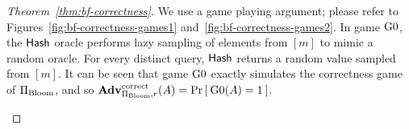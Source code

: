 \begin{proof}[Theorem~\ref{thm:bf-correctness}]
We use a game playing argument; please refer to
Figures~\ref{fig:bf-correctness-games1}
and~\ref{fig:bf-correctness-games2}. In game $\text{G0}$, the
$\mathsf{Hash}$ oracle performs lazy sampling of elements from $[m]$
to mimic a random oracle. For every distinct query, $\mathsf{Hash}$
returns a random value sampled from $[m]$. It can be seen that game
$\text{G0}$ exactly simulates the correctness game of
$\Pi_{\mathrm{Bloom}}$, and so
$\mathrm{\mathbf{Adv}}^{\mathrm{correct}}_{\Pi_{\mathrm{Bloom}},r}(A) = \Pr\left[\: \text{G0}(A) =
1 \:\right]$.

\begin{figure}[tp]
\end{figure}
\end{proof}
